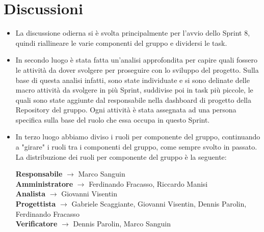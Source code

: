 \documentclass[a4paper,12pt]{article}
\begin{document}
\section{Discussioni}
\begin{itemize}
    \item La discussione odierna si è svolta principalmente per l'avvio dello Sprint 8, quindi riallineare le varie componenti del gruppo e dividersi le task.
    \item In secondo luogo è stata fatta un'analisi approfondita per capire quali fossero le attività da dover svolgere per proseguire con lo sviluppo del progetto. Sulla base di questa analisi infatti, sono state individuate e si sono delinate delle macro attività da svolgere in più Sprint, suddivise poi in task più piccole, le quali sono state aggiunte dal responsabile nella dashboard di progetto della Repository del gruppo. Ogni attività è stata assegnata ad una persona specifica sulla base del ruolo che essa occupa in questo Sprint.
    \item In terzo luogo abbiamo diviso i ruoli per componente del gruppo, continuando a "girare" i ruoli tra i componenti del gruppo, come sempre svolto in passato. La distribuzione dei ruoli per componente del gruppo è la seguente:
    \begin{center}
        \textbf{Responsabile} $\rightarrow$ Marco Sanguin\\
        \textbf{Amministratore} $\rightarrow$ Ferdinando Fracasso, Riccardo Manisi\\
        \textbf{Analista} $\rightarrow$ Giovanni Visentin\\
        \textbf{Progettista} $\rightarrow$ Gabriele Scaggiante, Giovanni Visentin, Dennis Parolin, Ferdinando Fracasso\\
        \textbf{Verificatore} $\rightarrow$ Dennis Parolin, Marco Sanguin
    \end{center}
\end{itemize}

\pagebreak
\end{document}
